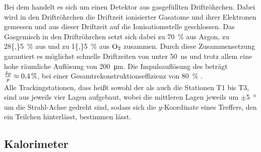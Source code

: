 Bei dem \ot handelt es sich um einen Detektor aus gasgefüllten Driftröhrchen. Dabei wird in den Driftröhrchen die Driftzeit ionisierter Gasatome und ihrer Elektronen gemessen und aus dieser Driftzeit auf die Ionisationsstelle geschlossen. Das Gasgemisch in den Driftröhrchen setzt sich dabei zu \SI{70}{\%} aus Argon, zu \SI{28{,}5}{\%} aus \cotwo  und zu \SI{1{,}5}{\%} aus {\ensuremath{\rm O_2}\xspace}  zusammen. Durch diese Zusammensetzung garantiert es möglichst schnelle Driftzeiten von unter \SI{50}{ns} und trotz allem eine hohe räumliche Auflösung von \SI{200}{\micro m}. Die Impulsauflösung des \ot beträgt $\frac{\delta p}{p}\approx\SI{0{,}4}{\%}$, bei einer Gesamtrekonstruktionseffizienz von \SI{80}{\%} \cite{Alves:2008zz}.\\
Alle Trackingstationen, dass heißt sowohl der \ttracker als auch die Stationen T$1$ bis T$3$, sind aus jeweils vier Lagen aufgebaut, wobei die mittleren Lagen jeweils um $\pm$\SI{5}{\degree} um die Strahl-Achse gedreht sind, sodass sich die $y$-Koordinate eines Treffers, den ein Teilchen hinterlässt, bestimmen lässt. 

\subsection{Kalorimeter}


